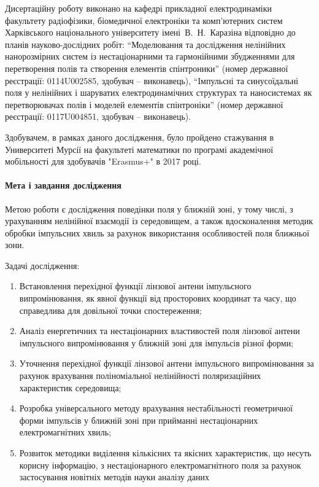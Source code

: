 Дисертаційну роботу виконано на кафедрі прикладної електродинаміки факультету 
радіофізики, біомедичної електроніки та комп’ютерних систем Харківського 
національного університету імені~В.~Н.~Каразіна відповідно до планів 
науково-дослідних робіт: ``Моделювання та дослідження 
нелінійних нанорозмірних систем із нестаціонарними та гармонійними 
збудженнями для перетворення полів та створення елементів спінтроники'' 
(номер державної реєстрації: 0114U002585, здобувач -- виконавець), 
``Імпульсні та синусоїдальні поля у нелінійних і шаруватих електродинамічних 
структурах та наносистемах як перетворювачах полів і моделей елементів 
спінтроніки'' (номер державної реєстрації: 0117U004851, здобувач -- виконавець).

Здобувачем, в рамках даного дослідження, було пройдено стажування в 
Университеті Мурсії на факультеті математики по програмі академічної 
мобільності для здобувачів "Erasmus+" в 2017 році.

\paragraph{Мета і завдання дослідження}

Метою роботи є дослідження поведінки поля у ближній зоні, у тому числі, з
урахуванням нелінійної взаємодії із середовищем, а також вдосконалення 
методик обробки імпульсних хвиль за рахунок використання особливостей поля 
ближньої зони.

Задачі дослідження:

\begin{enumerate}

\item Встановлення перехідної функції лінзової антени імпульсного 
випромінювання, як явної функції від просторових координат та часу, що 
справедлива для довільної точки спостереження;

\item Аналіз енергетичних та нестаціонарних властивостей поля лінзової антени 
імпульсного випромінювання у ближній зоні для імпульсів різної форми;

\item Уточнення перехідної функції лінзової антени імпульсного 
випромінювання за рахунок врахування поліноміальної нелінійності 
поляризаційних характеристик середовища;

\item Розробка універсального методу врахування нестабільності геометричної 
форми імпульсів у ближній зоні при прийманні нестаціонарних електромагнітних 
хвиль;

\item Розвиток методики виділення кількісних та якісних характеристик, що 
несуть корисну інформацію, з нестаціонарного електромагнітного поля за 
рахунок застосування новітніх методів науки аналізу даних

\end{enumerate}

